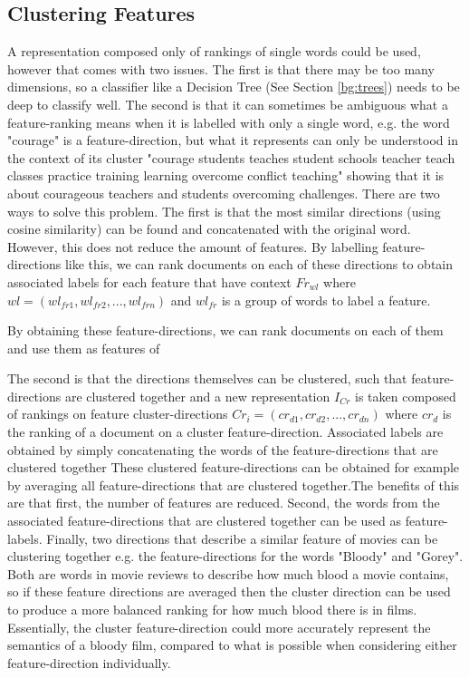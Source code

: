 \subsection{Clustering Features}\label{ch3:LabellingWords}
A representation composed only of rankings of single words could be used, however that comes with two issues. The first is that there may be too many dimensions, so a  classifier like a Decision Tree (See Section \ref{bg:trees})  needs to be deep to classify well. The second is that it can sometimes be ambiguous what a feature-ranking means when it is labelled with only a single word, e.g. the word "courage" is a feature-direction, but what it represents can only be understood in the context of its cluster "courage students teaches student schools teacher teach classes practice training learning overcome conflict teaching" showing that it is about courageous teachers and students overcoming challenges. There are two ways to solve this problem. The first is that the most similar directions (using cosine similarity) can be found and concatenated with the original word. However, this does not reduce the amount of features. By labelling feature-directions like this, we can rank documents on each of these directions to obtain  associated labels for each feature that have context ${Fr}_{wl}$ where ${wl} = ({wl}_{fr1}, {wl}_{fr2}, ..., {wl}_{frn})$ and ${wl}_{fr}$ is a group of words to label a feature.

By obtaining these feature-directions, we can rank documents on each of them and use them as features of 

The second is that the directions themselves can be clustered, such that feature-directions are clustered together and  a new representation $I_{Cr}$ is taken composed of rankings on feature cluster-directions  ${Cr_i} = ({cr}_{d1}, {cr}_{d2}, ..., {cr}_{dn})$ where ${cr}_d$ is the ranking of a document on a cluster feature-direction. Associated labels are obtained by simply concatenating the words of the feature-directions that are clustered together These clustered feature-directions can be obtained for example by averaging all feature-directions that are clustered together.The benefits of this are that first, the number of features are reduced. Second, the words from the associated feature-directions that are clustered together can be used as feature-labels. Finally,  two directions that describe a similar feature of movies can be clustering together  e.g. the feature-directions for the words "Bloody" and "Gorey". Both are words in movie reviews to describe how much blood a movie contains, so if these feature directions are averaged then the cluster direction can be used to produce a more balanced ranking for how much blood there is in films.  Essentially, the cluster feature-direction could more accurately represent the semantics of a bloody  film, compared to what is possible when considering either feature-direction individually.


